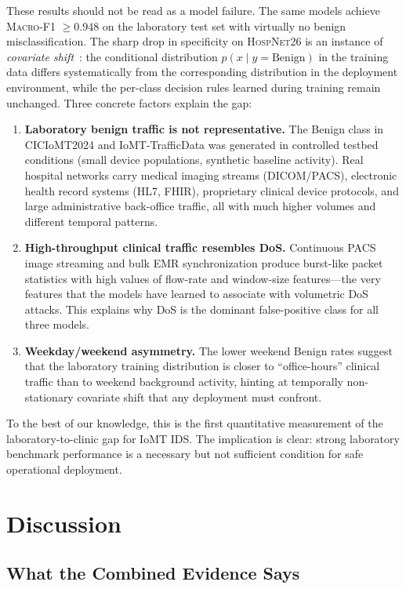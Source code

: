 \documentclass[runningheads]{llncs}
\newcommand{\macroF}{\textsc{Macro-F1}}
\begin{document}
These results should not be read as a model failure. The same models achieve \macroF{} $\geq 0.948$ on the laboratory test set with virtually no benign misclassification. The sharp drop in specificity on \textsc{HospNet26} is an instance of \emph{covariate shift}~\cite{sommer2010outside}: the conditional distribution $p(x \mid y = \mathrm{Benign})$ in the training data differs systematically from the corresponding distribution in the deployment environment, while the per-class decision rules learned during training remain unchanged. Three concrete factors explain the gap:
\begin{enumerate}[nosep,leftmargin=*]
  \item \textbf{Laboratory benign traffic is not representative.} The Benign class in CICIoMT2024 and IoMT-TrafficData was generated in controlled testbed conditions (small device populations, synthetic baseline activity). Real hospital networks carry medical imaging streams (DICOM/PACS), electronic health record systems (HL7, FHIR), proprietary clinical device protocols, and large administrative back-office traffic, all with much higher volumes and different temporal patterns.
  \item \textbf{High-throughput clinical traffic resembles DoS.} Continuous PACS image streaming and bulk EMR synchronization produce burst-like packet statistics with high values of flow-rate and window-size features---the very features that the models have learned to associate with volumetric DoS attacks. This explains why DoS is the dominant false-positive class for all three models.
  \item \textbf{Weekday/weekend asymmetry.} The lower weekend Benign rates suggest that the laboratory training distribution is closer to ``office-hours'' clinical traffic than to weekend background activity, hinting at temporally non-stationary covariate shift that any deployment must confront.
\end{enumerate}

To the best of our knowledge, this is the first quantitative measurement of the laboratory-to-clinic gap for IoMT IDS. The implication is clear: strong laboratory benchmark performance is a necessary but not sufficient condition for safe operational deployment.

\section{Discussion}
\label{sec:discussion}

\subsection{What the Combined Evidence Says}
\end{document}
